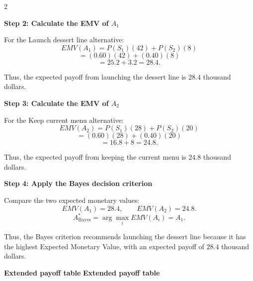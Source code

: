 	\noindent
	\setlength{\columnseprule}{0.4pt} 
	\begin{multicols}{2}
		\vspace{0pt}
		
		\textbf{Step 2: Calculate the EMV of $A_1$}
		
		For the Launch dessert line alternative:
		\[
		EMV(A_1)
		=
		P(S_1)(42)
		+
		P(S_2)(8)
		\]
		\[
		=
		(0.60)(42)
		+
		(0.40)(8)
		\]
		\[
		=
		25.2+3.2
		=
		28.4.
		\]
		
		Thus, the expected payoff from launching the dessert line is
		$28.4$ thousand dollars.
		
		\columnbreak
		
		\textbf{Step 3: Calculate the EMV of $A_2$}
		
		For the Keep current menu alternative:
		\[
		EMV(A_2)
		=
		P(S_1)(28)
		+
		P(S_2)(20)
		\]
		\[
		=
		(0.60)(28)
		+
		(0.40)(20)
		\]
		\[
		=
		16.8+8
		=
		24.8.
		\]
		
		Thus, the expected payoff from keeping the current menu is
		$24.8$ thousand dollars.
		
	\end{multicols}
	
	\setlength{\columnseprule}{0pt}
	
	\newpage
	
	\textbf{Step 4: Apply the Bayes decision criterion}
	
	Compare the two expected monetary values:
	$$
	EMV(A_1)=28.4,
	\qquad
	EMV(A_2)=24.8.
	$$
	$$
	A^*_{\mathrm{Bayes}}
	=
	\arg\max_i EMV(A_i)
	=
	A_1.
	$$
	
	Thus, the Bayes criterion recommends launching the dessert line because
	it has the highest Expected Monetary Value, with an expected payoff of
	$28.4$ thousand dollars.
	
	
	\textbf{Extended payoff table}
	\textbf{Extended payoff table}
	
